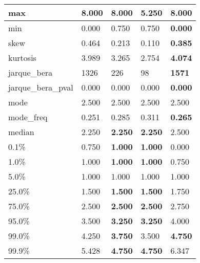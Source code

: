 \begin{table}[H]
\begin{tabular}{|l|m{10em}|m{10em}|m{10em}|m{10em}|}
\hline max & 8.000 & \bfseries 8.000 & \cellcolor[rgb]{0.9, 0.54, 0.52} 5.250 & \bfseries 8.000 \\
\hline min & 0.000 & \cellcolor[rgb]{0.9, 0.54, 0.52} 0.750 & \cellcolor[rgb]{0.9, 0.54, 0.52} 0.750 & \bfseries 0.000 \\
\hline skew & 0.464 & 0.213 & \cellcolor[rgb]{0.9, 0.54, 0.52} 0.110 & \bfseries 0.385 \\
\hline kurtosis & 3.989 & 3.265 & \cellcolor[rgb]{0.9, 0.54, 0.52} 2.754 & \bfseries 4.074 \\
\hline jarque\_bera & 1326 & 226 & \cellcolor[rgb]{0.9, 0.54, 0.52} 98 & \bfseries 1571 \\
\hline jarque\_bera\_pval & 0.000 & 0.000 & \cellcolor[rgb]{0.9, 0.54, 0.52} 0.000 & \bfseries 0.000 \\
\hline mode & 2.500 & 2.500 & 2.500 & 2.500 \\
\hline mode\_freq & 0.251 & 0.285 & \cellcolor[rgb]{0.9, 0.54, 0.52} 0.311 & \bfseries 0.265 \\
\hline median & 2.250 & \bfseries 2.250 & \bfseries 2.250 & \cellcolor[rgb]{0.9, 0.54, 0.52} 2.500 \\
\hline 0.1\% & 0.750 & \bfseries 1.000 & \bfseries 1.000 & \cellcolor[rgb]{0.9, 0.54, 0.52} 0.000 \\
\hline 1.0\% & 1.000 & \bfseries 1.000 & \bfseries 1.000 & \cellcolor[rgb]{0.9, 0.54, 0.52} 0.750 \\
\hline 5.0\% & 1.000 & 1.000 & 1.000 & 1.000 \\
\hline 25.0\% & 1.500 & \bfseries 1.500 & \bfseries 1.500 & \cellcolor[rgb]{0.9, 0.54, 0.52} 1.750 \\
\hline 75.0\% & 2.500 & \bfseries 2.500 & \bfseries 2.500 & \cellcolor[rgb]{0.9, 0.54, 0.52} 2.750 \\
\hline 95.0\% & 3.500 & \bfseries 3.250 & \bfseries 3.250 & \cellcolor[rgb]{0.9, 0.54, 0.52} 4.000 \\
\hline 99.0\% & 4.250 & \bfseries 3.750 & \cellcolor[rgb]{0.9, 0.54, 0.52} 3.500 & \bfseries 4.750 \\
\hline 99.9\% & 5.428 & \bfseries 4.750 & \bfseries 4.750 & \cellcolor[rgb]{0.9, 0.54, 0.52} 6.347 \\
\hline
\end{tabular}
\end{table}

